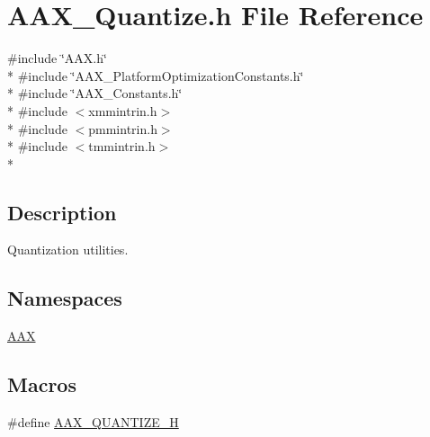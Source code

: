\hypertarget{a00287}{}\section{A\+A\+X\+\_\+\+Quantize.\+h File Reference}
\label{a00287}
{\ttfamily \#include \char`\"{}A\+A\+X.\+h\char`\"{}}\\*
{\ttfamily \#include \char`\"{}A\+A\+X\+\_\+\+Platform\+Optimization\+Constants.\+h\char`\"{}}\\*
{\ttfamily \#include \char`\"{}A\+A\+X\+\_\+\+Constants.\+h\char`\"{}}\\*
{\ttfamily \#include $<$xmmintrin.\+h$>$}\\*
{\ttfamily \#include $<$pmmintrin.\+h$>$}\\*
{\ttfamily \#include $<$tmmintrin.\+h$>$}\\*


\subsection{Description}
Quantization utilities. 

\subsection*{Namespaces}
\begin{DoxyCompactItemize}
\item 
 \hyperlink{a00288}{A\+A\+X}
\end{DoxyCompactItemize}
\subsection*{Macros}
\begin{DoxyCompactItemize}
\item 
\#define \hyperlink{a00287_a8110c1ecf6144fb29de6c94c0572327c}{A\+A\+X\+\_\+\+Q\+U\+A\+N\+T\+I\+Z\+E\+\_\+\+H}
\end{DoxyCompactItemize}
